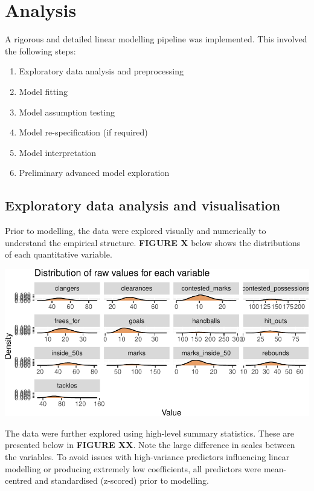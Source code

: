 \documentclass{article}
\begin{document}
\hypertarget{analysis}{%
\section{Analysis}\label{analysis}}

A rigorous and detailed linear modelling pipeline was implemented. This
involved the following steps:

\begin{enumerate}
\def\labelenumi{\arabic{enumi}.}
\tightlist
\item
  Exploratory data analysis and preprocessing
\item
  Model fitting
\item
  Model assumption testing
\item
  Model re-specification (if required)
\item
  Model interpretation
\item
  Preliminary advanced model exploration
\end{enumerate}

\hypertarget{exploratory-data-analysis-and-visualisation}{%
\subsection{Exploratory data analysis and
visualisation}\label{exploratory-data-analysis-and-visualisation}}

Prior to modelling, the data were explored visually and numerically to
understand the empirical structure. \textbf{FIGURE X} below shows the
distributions of each quantitative variable.

\includegraphics{OLET5608_TrentHenderson_files/figure-latex/unnamed-chunk-4-1.pdf}

The data were further explored using high-level summary statistics.
These are presented below in \textbf{FIGURE XX}. Note the large
difference in scales between the variables. To avoid issues with
high-variance predictors influencing linear modelling or producing
extremely low coefficients, all predictors were mean-centred and
standardised (z-scored) prior to modelling.
\end{document}
